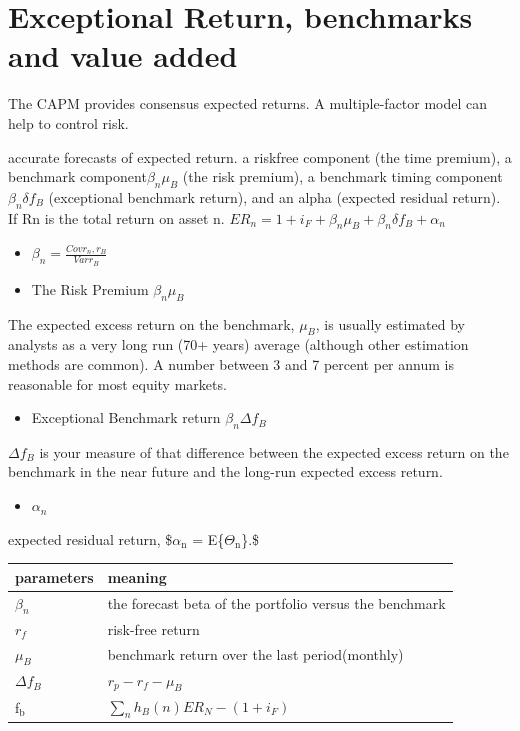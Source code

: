 \documentclass[presentation]{beamer}
\begin{document}
\section{Exceptional Return, benchmarks and value added}
\label{sec:orgheadline6}
The CAPM provides consensus expected returns. A multiple-factor model can help to control risk.

accurate forecasts of expected return.
a riskfree component (the time premium), a benchmark component\(\beta_n \mu_B\)  (the risk premium), a benchmark timing component\(\beta_n \delta f_B\) (exceptional benchmark return), and an alpha (expected residual return). If Rn is the total return on asset n.
\(E{R_n} = 1 + i_F + \beta_n \mu_B + \beta_n \delta f_B + \alpha_n\)
\begin{itemize}
\item \(\beta_n = \frac{Cov{r_n,r_B}}{Var{r_B}}\)
\item The Risk Premium \(\beta_n \mu_B\)
\end{itemize}
The expected excess return on the benchmark, \(\mu_B\), is usually estimated by analysts as a very long run (70+ years) average (although other estimation methods are common). A number between 3 and 7 percent per annum is reasonable for most equity markets.
\begin{itemize}
\item Exceptional Benchmark return \(\beta_n \Delta f_B\)
\end{itemize}
\(\Delta f_B\) is your measure of that difference between the expected excess return on the benchmark in the near future and the long-run expected excess return.
\begin{itemize}
\item \(\alpha_n\)
\end{itemize}
expected residual return, \$\(\alpha_{\text{n}}\) = E\{\(\Theta_{\text{n}}\)\}.\$
\begin{center}
\begin{tabular}{ll}
parameters & meaning\\
\hline
\(\beta_n\) & the forecast beta of the portfolio versus the benchmark\\
\(r_f\) & risk-free return\\
\(\mu_B\) & benchmark return over the last period(monthly)\\
\(\Delta f_B\) & \(r_p - r_f - \mu_B\)\\
f\(_{\text{b}}\) & \(\displaystyle\sum_{n} h_B(n)E{R_N}-(1+i_F)\)\\
\end{tabular}
\end{center}
\end{document}
